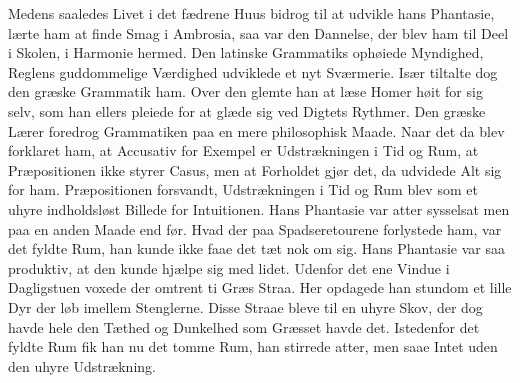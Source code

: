 \documentclass[12pt,a4paper]{article}
\begin{document}
Medens saaledes Livet i det fædrene Huus bidrog til at udvikle hans Phantasie, lærte ham at finde Smag i Ambrosia, saa var den Dannelse, der blev ham til Deel i Skolen, i Harmonie hermed. Den latinske Grammatiks ophøiede Myndighed, Reglens guddommelige Værdighed udviklede et nyt Sværmerie. Især tiltalte dog den græske Grammatik ham. Over den glemte han at læse Homer høit for sig selv, som han ellers pleiede for at glæde sig ved Digtets Rythmer. Den græske Lærer foredrog Grammatiken paa en mere philosophisk Maade. Naar det da blev forklaret ham, at Accusativ for Exempel er Udstrækningen i Tid og Rum, at Præpositionen ikke styrer Casus, men at Forholdet gjør det, da udvidede Alt sig for ham. Præpositionen forsvandt, Udstrækningen i Tid og Rum blev som et uhyre indholdsløst Billede for Intuitionen. Hans Phantasie var atter sysselsat men paa en anden Maade end før. Hvad der paa Spadseretourene forlystede ham, var det fyldte Rum, han kunde ikke faae det tæt nok om sig. Hans Phantasie var saa produktiv, at den kunde hjælpe sig med lidet. Udenfor det ene Vindue i Dagligstuen voxede der omtrent ti Græs Straa. Her opdagede han stundom et lille Dyr der løb imellem Stenglerne. Disse Straae bleve til en uhyre Skov, der dog havde hele den Tæthed og Dunkelhed som Græsset havde det. Istedenfor det fyldte Rum fik han nu det tomme Rum, han stirrede atter, men saae Intet uden den uhyre Udstrækning.
\end{document}
